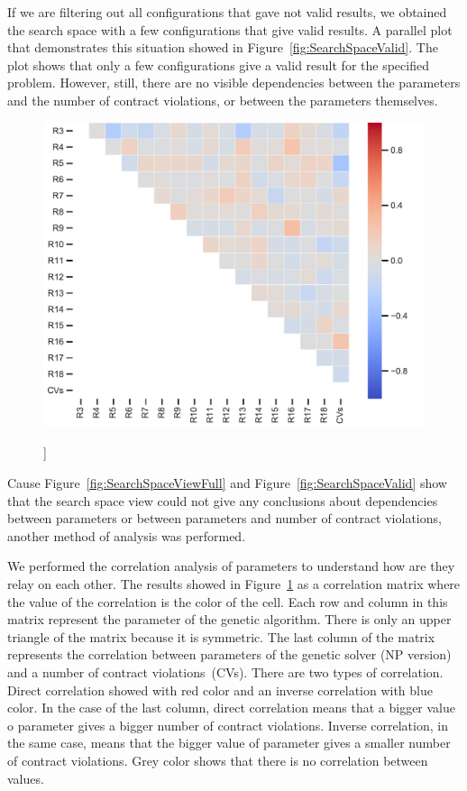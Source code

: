If we are filtering out all configurations that gave not valid results, we obtained the search space with a few configurations that give valid results. A parallel plot that demonstrates this situation showed in Figure~\ref{fig:SearchSpaceValid}. The plot shows that only a few configurations give a valid result for the specified problem. However, still, there are no visible dependencies between the parameters and the number of contract violations, or between the parameters themselves.

\begin{figure}
	\centering
	\includegraphics[width=\textwidth]{images/CorrelationAnalysis.pdf}
	\caption[]]{}
	\label{fig:CorrelationAnalysis}
\end{figure}

Cause Figure~\ref{fig:SearchSpaceViewFull} and Figure~\ref{fig:SearchSpaceValid} show that the search space view could not give any conclusions about dependencies between parameters or between parameters and number of contract violations, another method of analysis was performed.

We performed the correlation analysis of parameters to understand how are they relay on each other. The results showed in Figure~\ref{fig:CorrelationAnalysis} as a correlation matrix where the value of the correlation is the color of the cell. Each row and column in this matrix represent the parameter of the genetic algorithm. There is only an upper triangle of the matrix because it is symmetric. The last column of the matrix represents the correlation between parameters of the genetic solver (NP version) and a number of contract violations~(CVs). There are two types of correlation. Direct correlation showed with red color and an inverse correlation with blue color. In the case of the last column, direct correlation means that a bigger value o parameter gives a bigger number of contract violations. Inverse correlation, in the same case, means that the bigger value of parameter gives a smaller number of contract violations. Grey color shows that there is no correlation between values.


